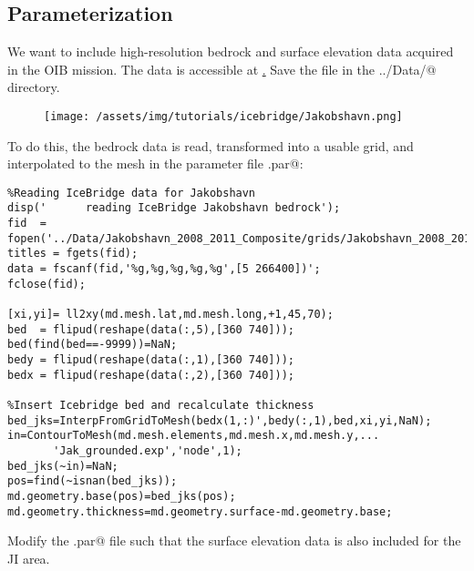 \subsection{Parameterization} %
We want to include high-resolution bedrock and surface elevation data acquired in the OIB mission. The data is accessible at \href{http://data.cresis.ku.edu/data/grids/Jakobshavn_2008_2011_Composite_XYZGrid.txt}. Save the file in the \verb@../Data/@ directory.
\begin{figure}[H]
	\begin{center}
	\texttt{[image: /assets/img/tutorials/icebridge/Jakobshavn.png]}
\end{center}
\end{figure}
To do this, the bedrock data is read, transformed into a usable grid, and interpolated to the mesh in the parameter file \verb@Greenland.par@:
\begin{verbatim}%Reading IceBridge data for Jakobshavn
disp('      reading IceBridge Jakobshavn bedrock');
fid  = fopen('../Data/Jakobshavn_2008_2011_Composite/grids/Jakobshavn_2008_2011_Composite_XYZGrid.txt');
titles = fgets(fid); 
data = fscanf(fid,'%g,%g,%g,%g,%g',[5 266400])';
fclose(fid);

[xi,yi]= ll2xy(md.mesh.lat,md.mesh.long,+1,45,70);
bed  = flipud(reshape(data(:,5),[360 740])); bed(find(bed==-9999))=NaN;
bedy = flipud(reshape(data(:,1),[360 740]));
bedx = flipud(reshape(data(:,2),[360 740]));

%Insert Icebridge bed and recalculate thickness
bed_jks=InterpFromGridToMesh(bedx(1,:)',bedy(:,1),bed,xi,yi,NaN);
in=ContourToMesh(md.mesh.elements,md.mesh.x,md.mesh.y,...
	   'Jak_grounded.exp','node',1);
bed_jks(~in)=NaN;
pos=find(~isnan(bed_jks));
md.geometry.base(pos)=bed_jks(pos);
md.geometry.thickness=md.geometry.surface-md.geometry.base;\end{verbatim}

Modify the \verb@Greenland.par@ file such that the surface elevation data is also included for the JI area.

\vspace{5cm}


